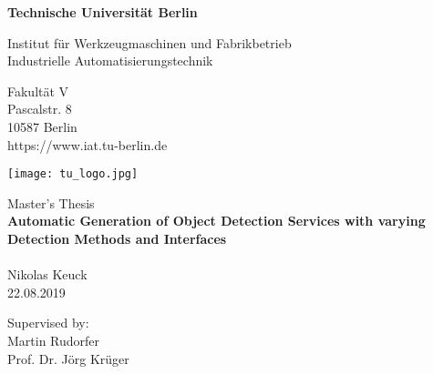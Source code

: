 \thispagestyle{empty}
\begin{center}

\vspace*{1.4cm}
{\LARGE \textbf{Technische Universität Berlin}}

\vspace{0.5cm}

{\large Institut für Werkzeugmaschinen und Fabrikbetrieb\\[1mm]}
{\large Industrielle Automatisierungstechnik\\[5mm]}

Fakultät V\\
Pascalstr. 8\\
10587 Berlin\\
https://www.iat.tu-berlin.de\\

\vspace*{1cm}

\texttt{[image: tu\_logo.jpg]}

\vspace*{1.0cm}

{\LARGE Master's Thesis}\\

\vspace{1.0cm}
{\LARGE \textbf{Automatic Generation of Object Detection Services with varying Detection Methods and Interfaces}}\\

{\LARGE \textbf{}}\\
\vspace*{0.5cm}
{\LARGE Nikolas Keuck}
\\
\vspace*{0.5cm}
22.08.2019\\ %
\vspace*{0.5cm}

Supervised by:\\
\vspace{0.2cm}
Martin Rudorfer\\
Prof. Dr. Jörg Krüger


\end{center}
\restoregeometry
